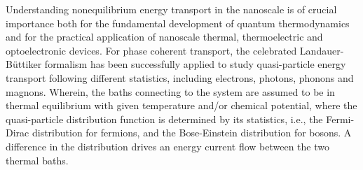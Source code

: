 \documentclass[aps,prb,
,floatfix,footinbib,shortbibliography,
preprint
]{revtex4-1}
\begin{document}
Understanding nonequilibrium energy transport in the nanoscale is of crucial importance both for the fundamental development of quantum thermodynamics and for the practical application of nanoscale thermal, thermoelectric and optoelectronic devices. For phase coherent transport, the celebrated Landauer-B\"uttiker formalism has been successfully applied to study quasi-particle energy transport following different statistics, including electrons\cite{imry1999conductance}, photons\cite{ojanen2008mesoscopic,biehs2010mesoscopic,zhang2018energy,benabdallah2014near}, phonons\cite{rego1998quantized,mingo2005carbon,yamamoto2006nonequilibrium,wang2006nonequilibrium,wang2007nonequilibrium,wang2008quantum,ruokola2009thermal,li2012colloquium,taylor2015quantum,wang2016landauer} and magnons\cite{wang2004spin}.
Wherein, the baths connecting to the system are assumed to be in thermal equilibrium with given temperature and/or chemical potential, where the quasi-particle distribution function  is determined by its statistics, i.e., the Fermi-Dirac distribution for fermions, and the Bose-Einstein distribution for bosons. A difference in the distribution drives an energy current flow between the two thermal baths. 



\end{document}
